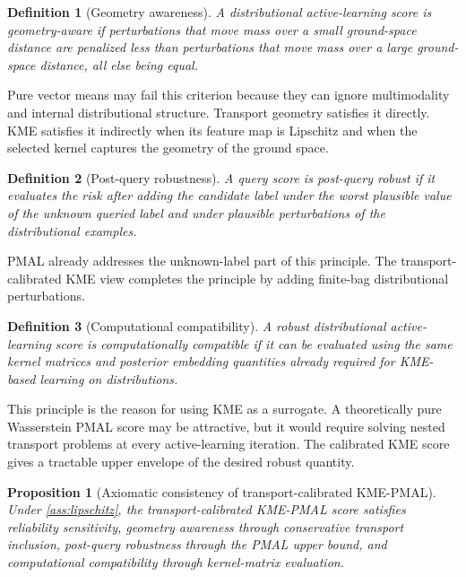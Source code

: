 \documentclass[10pt,journal]{IEEEtran}
\newtheorem{definition}{Definition}
\newtheorem{proposition}{Proposition}
\begin{document}
\begin{definition}[Geometry awareness]
A distributional active-learning score is geometry-aware if perturbations that move mass over a small ground-space distance are penalized less than perturbations that move mass over a large ground-space distance, all else being equal.
\end{definition}

Pure vector means may fail this criterion because they can ignore multimodality and internal distributional structure. Transport geometry satisfies it directly. KME satisfies it indirectly when its feature map is Lipschitz and when the selected kernel captures the geometry of the ground space.

\begin{definition}[Post-query robustness]
A query score is post-query robust if it evaluates the risk after adding the candidate label under the worst plausible value of the unknown queried label and under plausible perturbations of the distributional examples.
\end{definition}

PMAL already addresses the unknown-label part of this principle. The transport-calibrated KME view completes the principle by adding finite-bag distributional perturbations.

\begin{definition}[Computational compatibility]
A robust distributional active-learning score is computationally compatible if it can be evaluated using the same kernel matrices and posterior embedding quantities already required for KME-based learning on distributions.
\end{definition}

This principle is the reason for using KME as a surrogate. A theoretically pure Wasserstein PMAL score may be attractive, but it would require solving nested transport problems at every active-learning iteration. The calibrated KME score gives a tractable upper envelope of the desired robust quantity.

\begin{proposition}[Axiomatic consistency of transport-calibrated KME-PMAL]
\label{prop:axioms}
Under \cref{ass:lipschitz}, the transport-calibrated KME-PMAL score satisfies reliability sensitivity, geometry awareness through conservative transport inclusion, post-query robustness through the PMAL upper bound, and computational compatibility through kernel-matrix evaluation.
\end{proposition}
\end{document}
